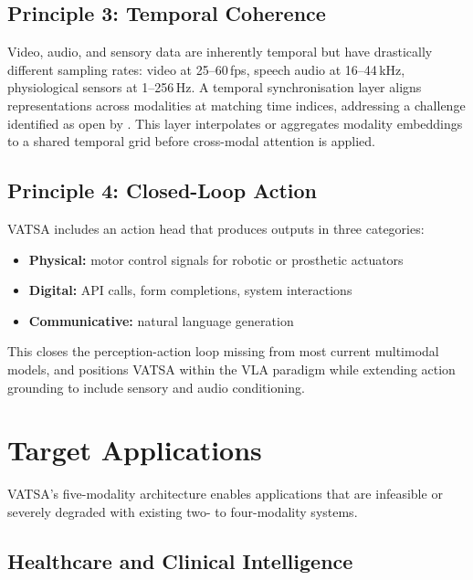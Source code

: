 \documentclass[11pt,a4paper]{article}
\begin{document}
\subsection{Principle 3: Temporal Coherence}
\label{subsec:temporal}

Video, audio, and sensory data are inherently temporal but have drastically different
sampling rates: video at 25--60\,fps, speech audio at 16--44\,kHz, physiological
sensors at 1--256\,Hz.  A temporal synchronisation layer aligns representations across
modalities at matching time indices, addressing a challenge identified as open by
\citet{liu2025embodied}.  This layer interpolates or aggregates modality embeddings
to a shared temporal grid before cross-modal attention is applied.

\subsection{Principle 4: Closed-Loop Action}
\label{subsec:action}

VATSA includes an action head that produces outputs in three categories:

\begin{itemize}[leftmargin=2em]
  \item \textbf{Physical:} motor control signals for robotic or prosthetic actuators
  \item \textbf{Digital:} API calls, form completions, system interactions
  \item \textbf{Communicative:} natural language generation
\end{itemize}

This closes the perception-action loop missing from most current multimodal models,
and positions VATSA within the VLA paradigm \citep{ma2024vla} while extending
action grounding to include sensory and audio conditioning.

\section{Target Applications}
\label{sec:applications}

VATSA's five-modality architecture enables applications that are infeasible or
severely degraded with existing two- to four-modality systems.

\subsection{Healthcare and Clinical Intelligence}
\end{document}
